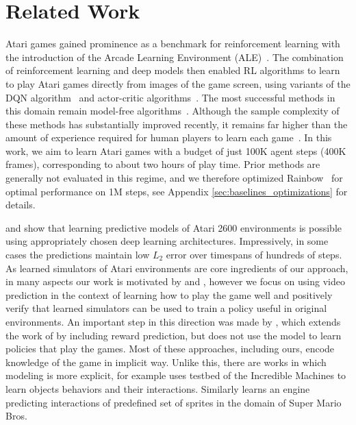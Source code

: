 \section{Related Work}
\label{sec:related_work}

Atari games gained prominence as a benchmark for reinforcement learning with the introduction of the Arcade Learning Environment (ALE)~\cite{ale}. The combination of reinforcement learning and deep models then enabled RL algorithms to learn to play Atari games directly from images of the game screen, using variants of the DQN algorithm~\citep{dqn, dqn2, rainbow} and actor-critic algorithms~\citep{a3c,ppo,ga3c,acktr,vtrace}.
The most successful methods in this domain remain model-free algorithms~\citep{rainbow,vtrace}. Although the sample complexity of these methods has substantially improved recently, it remains far higher than the amount of experience required for human players to learn each game~\citep{human_atari_minutes}. In this work, we aim to learn Atari games with a budget of just 100K agent steps (400K frames), corresponding to about two hours of play time. Prior methods are generally not evaluated in this regime, and we therefore optimized Rainbow~\citep{rainbow} for optimal performance on 1M steps, see Appendix \ref{sec:baselines_optimizations} for details.

\citet{video_prediction} and \citet{recurrent} show that learning predictive models of Atari 2600 environments is possible using appropriately chosen deep learning architectures. Impressively, in some cases the predictions maintain low $L_2$ error over timespans of hundreds of steps. 
As learned simulators of Atari environments are core ingredients of our approach, in many aspects our work is motivated by \citet{video_prediction} and \citet{recurrent}, however we focus on using video prediction in the context of learning how to play the game well and positively verify that learned simulators can be used to train a policy useful in original environments.
An important step in this direction was made by \citet{video_reward_prediction}, which extends the work of \citet{video_prediction} by including reward prediction, but does not use the model to learn policies that play the games.
Most of these approaches, including ours, encode knowledge of the game in implicit way. Unlike this, there are works in which modeling is more explicit, for example \cite{ersen2014learning} uses testbed of the Incredible Machines to learn objects behaviors and their interactions.
Similarly \citet{guzdial2017game} learns an engine predicting interactions of predefined set of sprites in the domain of Super Mario Bros.

